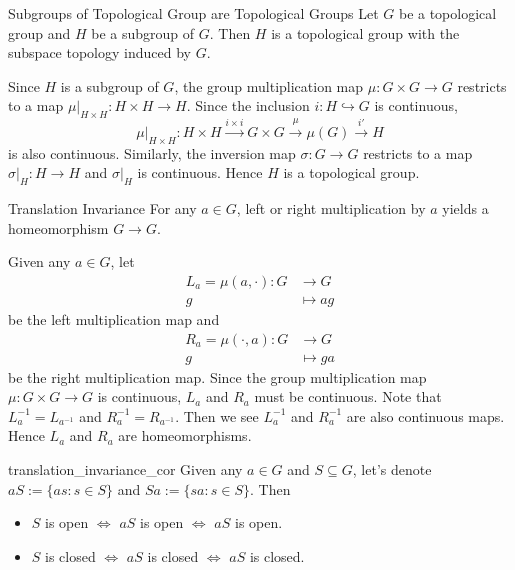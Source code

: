 \begin{proposition}{Subgroups of Topological Group are Topological Groups}{}
    Let $G$ be a topological group and $H$ be a subgroup of $G$. Then $H$ is a topological group with the subspace topology induced by $G$.
\end{proposition}

\begin{prf}
    Since $H$ is a subgroup of $G$, the group multiplication map $\mu:G\times G\to G$ restricts to a map $\mu|_{H\times H}:H\times H\to H$. Since the inclusion $i:H\hookrightarrow G$ is continuous, 
    \[
        \mu|_{H\times H}:H \times H \xrightarrow{i\times i} G\times G\xrightarrow{\mu}\mu(G)  \xrightarrow{i'} H
    \]
    is also continuous. Similarly, the inversion map $\sigma:G\to G$ restricts to a map $\sigma|_H:H\to H$ and $\sigma|_H$ is continuous. Hence $H$ is a topological group.
    
\end{prf}


\begin{proposition}{Translation Invariance}{}
    For any $a \in G$, left or right multiplication by $a$ yields a homeomorphism $G \rightarrow G$.
\end{proposition}

\begin{prf}
    Given any $a\in G$, let 
    \begin{align*}
        L_a=\mu(a,\cdot):G&\longrightarrow G\\
        g&\longmapsto ag
    \end{align*}
    be the left multiplication map and
    \begin{align*}
        R_a=\mu(\cdot,a):G&\longrightarrow G\\
        g&\longmapsto ga
    \end{align*}
    be the right multiplication map. Since the group multiplication map $\mu:G\times G\to G$ is continuous, $L_a$ and $R_a$ must be continuous. Note that $L_a^{-1}=L_{a^{-1}}$ and $R_a^{-1}=R_{a^{-1}}$. Then we see $L_a^{-1}$ and $R_a^{-1}$ are also continuous maps. Hence $L_a$ and $R_a$ are homeomorphisms.
\end{prf}


\begin{corollary}{}{translation_invariance_cor}
    Given any $a \in G$ and $S \subseteq G$, let's denote $a S:=\{a s: s \in S\}$ and $S a:=\{s a: s \in S\}$. Then
    \begin{itemize}
        \item $S$ is open $\iff$ $a S$ is open $\iff$ $a S$ is open.
        \item $S$ is closed $\iff$ $a S$ is closed $\iff$ $a S$ is closed.
    \end{itemize}
\end{corollary}

